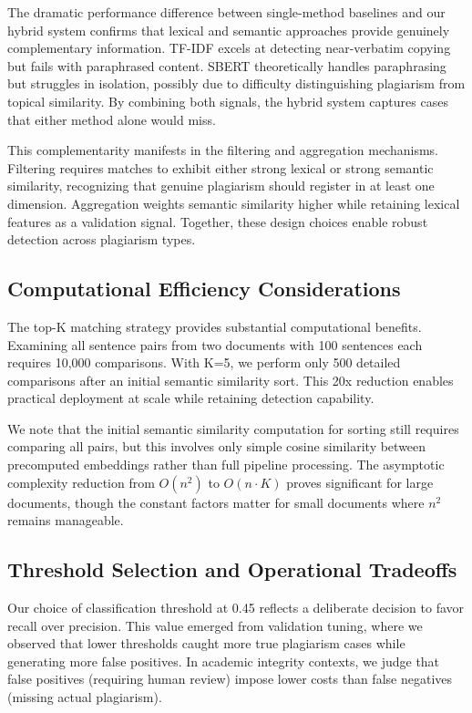 \documentclass[conference]{IEEEtran}
\begin{document}
The dramatic performance difference between single-method baselines and our hybrid system confirms that lexical and semantic approaches provide genuinely complementary information. TF-IDF excels at detecting near-verbatim copying but fails with paraphrased content. SBERT theoretically handles paraphrasing but struggles in isolation, possibly due to difficulty distinguishing plagiarism from topical similarity. By combining both signals, the hybrid system captures cases that either method alone would miss.

This complementarity manifests in the filtering and aggregation mechanisms. Filtering requires matches to exhibit either strong lexical or strong semantic similarity, recognizing that genuine plagiarism should register in at least one dimension. Aggregation weights semantic similarity higher while retaining lexical features as a validation signal. Together, these design choices enable robust detection across plagiarism types.

\subsection{Computational Efficiency Considerations}

The top-K matching strategy provides substantial computational benefits. Examining all sentence pairs from two documents with 100 sentences each requires 10,000 comparisons. With K=5, we perform only 500 detailed comparisons after an initial semantic similarity sort. This 20x reduction enables practical deployment at scale while retaining detection capability.

We note that the initial semantic similarity computation for sorting still requires comparing all pairs, but this involves only simple cosine similarity between precomputed embeddings rather than full pipeline processing. The asymptotic complexity reduction from $O(n^2)$ to $O(n \cdot K)$ proves significant for large documents, though the constant factors matter for small documents where $n^2$ remains manageable.

\subsection{Threshold Selection and Operational Tradeoffs}

Our choice of classification threshold at 0.45 reflects a deliberate decision to favor recall over precision. This value emerged from validation tuning, where we observed that lower thresholds caught more true plagiarism cases while generating more false positives. In academic integrity contexts, we judge that false positives (requiring human review) impose lower costs than false negatives (missing actual plagiarism).
\end{document}
